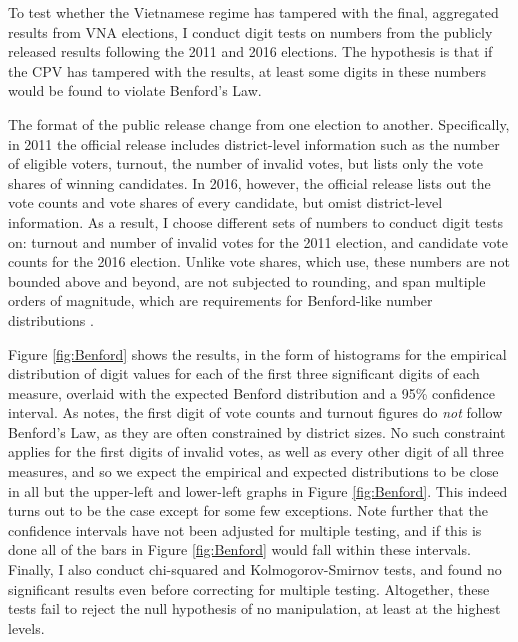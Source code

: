 \documentclass[12pt]{article}
\newcommand{\1}{\mathbbm{1}}
\begin{document}
To test whether the Vietnamese regime has tampered with the final, aggregated results from VNA elections, I conduct digit tests on numbers from the publicly released results following the 2011 and 2016 elections. The hypothesis is that if the CPV has tampered with the results, at least some digits in these numbers would be found to violate Benford's Law. 

The format of the public release change from one election to another. Specifically, in 2011 the official release includes district-level information such as the number of eligible voters, turnout, the number of invalid votes, but lists only the vote shares of winning candidates. In 2016, however, the official release lists out the vote counts and vote shares of every candidate, but omist district-level information. As a result, I choose different sets of numbers to conduct digit tests on: turnout and number of invalid votes for the 2011 election, and candidate vote counts for the 2016 election. Unlike vote shares, which \citet{MaleskySchuler2011} use, these numbers are not bounded above and beyond, are not subjected to rounding, and span multiple orders of magnitude, which are requirements for Benford-like number distributions \citep{Hill1995, Mebane2006, Berger2015}.

Figure \ref{fig:Benford} shows the results, in the form of histograms for the empirical distribution of digit values for each of the first three significant digits of each measure, overlaid with the expected Benford distribution and a 95\% confidence interval. As \citet{Mebane2006} notes, the first digit of vote counts and turnout figures do \textit{not} follow Benford's Law, as they are often constrained by district sizes. No such constraint applies for the first digits of invalid votes, as well as every other digit of all three measures, and so we expect the empirical and expected distributions to be close in all but the upper-left and lower-left graphs in Figure \ref{fig:Benford}. This indeed turns out to be the case except for some few exceptions. Note further that the confidence intervals have not been adjusted for multiple testing, and if this is done all of the bars in Figure \ref{fig:Benford} would fall within these intervals. Finally, I also conduct chi-squared and Kolmogorov-Smirnov tests, and found no significant results even before correcting for multiple testing. Altogether, these tests fail to reject the null hypothesis of no manipulation, at least at the highest levels.
\end{document}

